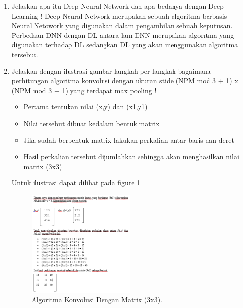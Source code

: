 \begin{enumerate}
\item Jelaskan apa itu Deep Neural Network dan apa bedanya dengan Deep Learning !
	\subitem Deep Neural Network merupakan sebuah algoritma berbasis Neural Netowork yang digunakan dalam pengambilan sebuah keputusan. Perbedaan DNN dengan DL antara lain DNN merupakan algoritma yang digunakan terhadap DL sedangkan DL yang akan menggunakan algoritma tersebut.

\item Jelaskan dengan ilustrasi gambar langkah per langkah bagaimana perhitungan algoritma konvolusi dengan ukuran stide (NPM mod 3 + 1) x (NPM mod 3 + 1) yang terdapat max pooling !

	\begin{itemize}
		\item Pertama tentukan nilai (x,y) dan (x1,y1)
		\item Nilai tersebut dibuat kedalam bentuk matrix
		\item Jika sudah berbentuk matrix lakukan perkalian antar baris dan deret
		\item Hasil perkalian tersebut dijumlahkan sehingga akan menghasilkan nilai matrix (3x3)
	\end{itemize}

	\subitem Untuk ilustrasi dapat dilihat pada figure \ref{YNC7-8}

	\begin{figure}[!htbp!]
		\centerline{\includegraphics[width=0.5\textwidth]{figures/YN/Chapter7/YNC7-8.png}}
		\caption{Algoritma Konvolusi Dengan Matrix (3x3).}
		\label{YNC7-8}
	\end{figure}	

\end{enumerate}

